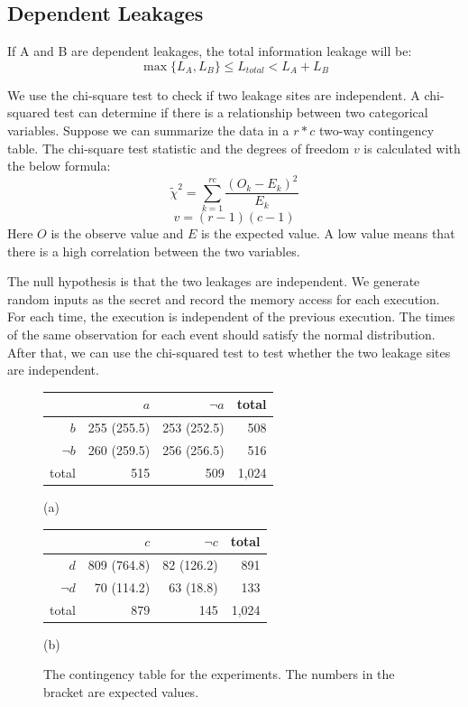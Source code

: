 \subsection{Dependent Leakages}
If A and B are dependent leakages, the total information leakage will be:
\[\max{\{L_A, L_B\}}  \leq L_{\mathit{total}} < L_A + L_B\]

We use the chi-square test to check if two leakage sites are independent. A chi-squared test can determine if there is a relationship between two categorical variables. Suppose we can summarize the data in a $r*c$  two-way contingency table. The chi-square test statistic and the degrees of freedom $v$ is calculated with the below formula:
\[\tilde{\chi}^2=\sum_{k=1}^{rc} \frac{(O_k - E_k)^2}{E_k}\] 
\[v = (r - 1)(c - 1)\]
Here $O$ is the observe value and $E$ is the expected value. A low value means that there is a high correlation between the two variables. 

The null hypothesis is that the two leakages are independent.
We generate random inputs as the secret and record the memory access for each execution. For each time, the execution is independent of the previous execution. The times of the same observation for each event should satisfy the normal distribution. After that, we can use the chi-squared test to test whether the two leakage sites are independent.

\begin{figure}[h]
  \begin{minipage}{0.40\linewidth}
      \begin{tabular}{rrrr}
        \toprule
        & $a$ & $\lnot a$  & total\\
        \midrule
        $b$   & 255 (255.5) & 253 (252.5) &   508  \\
        $\lnot b$   & 260 (259.5)  & 256 (256.5) &    516   \\
        total &   515 &  509   & 1,024   \\
        \bottomrule
      \end{tabular}\caption*{(a)}
  \end{minipage}
\hspace{-15pt}
\hfill
\hspace{-15pt}
  \begin{minipage}{0.40\linewidth}
      \begin{tabular}{rrrr}
        \toprule
        & $c$ & $\lnot c$  & total\\
        \midrule
        $d$   & 809 (764.8) & 82 (126.2) & 891    \\
        $\lnot d$   & 70 (114.2)  & 63 (18.8)&  133     \\
        total &  879 &  145  & 1,024    \\
        \bottomrule
      \end{tabular}\caption*{(b)}
  \end{minipage}
  \caption{The contingency table for the experiments. The numbers in the bracket are expected values. }\label{chapter5:fig:con_table}
\end{figure}


